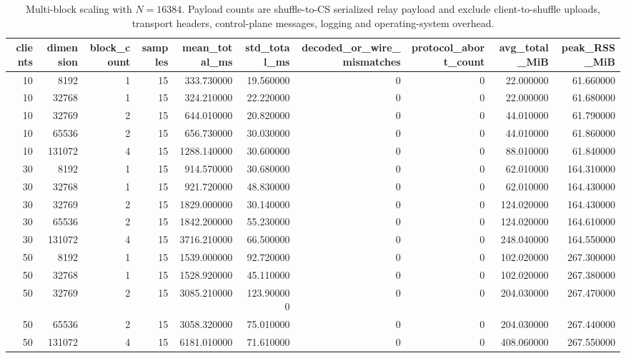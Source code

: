 \begin{table}
\caption{Multi-block scaling with \(N=16384\). Payload counts are shuffle-to-CS serialized relay payload and exclude client-to-shuffle uploads, transport headers, control-plane messages, logging and operating-system overhead.}
\label{tab:eval-multiblock}
\begin{tabular}{rrrrrrrrrr}
\toprule
clients & dimension & block_count & samples & mean_total_ms & std_total_ms & decoded_or_wire_mismatches & protocol_abort_count & avg_total_MiB & peak_RSS_MiB \\
\midrule
10 & 8192 & 1 & 15 & 333.730000 & 19.560000 & 0 & 0 & 22.000000 & 61.660000 \\
10 & 32768 & 1 & 15 & 324.210000 & 22.220000 & 0 & 0 & 22.000000 & 61.680000 \\
10 & 32769 & 2 & 15 & 644.010000 & 20.820000 & 0 & 0 & 44.010000 & 61.790000 \\
10 & 65536 & 2 & 15 & 656.730000 & 30.030000 & 0 & 0 & 44.010000 & 61.860000 \\
10 & 131072 & 4 & 15 & 1288.140000 & 30.600000 & 0 & 0 & 88.010000 & 61.840000 \\
30 & 8192 & 1 & 15 & 914.570000 & 30.680000 & 0 & 0 & 62.010000 & 164.310000 \\
30 & 32768 & 1 & 15 & 921.720000 & 48.830000 & 0 & 0 & 62.010000 & 164.430000 \\
30 & 32769 & 2 & 15 & 1829.000000 & 30.140000 & 0 & 0 & 124.020000 & 164.430000 \\
30 & 65536 & 2 & 15 & 1842.200000 & 55.230000 & 0 & 0 & 124.020000 & 164.610000 \\
30 & 131072 & 4 & 15 & 3716.210000 & 66.500000 & 0 & 0 & 248.040000 & 164.550000 \\
50 & 8192 & 1 & 15 & 1539.000000 & 92.720000 & 0 & 0 & 102.020000 & 267.300000 \\
50 & 32768 & 1 & 15 & 1528.920000 & 45.110000 & 0 & 0 & 102.020000 & 267.380000 \\
50 & 32769 & 2 & 15 & 3085.210000 & 123.900000 & 0 & 0 & 204.030000 & 267.470000 \\
50 & 65536 & 2 & 15 & 3058.320000 & 75.010000 & 0 & 0 & 204.030000 & 267.440000 \\
50 & 131072 & 4 & 15 & 6181.010000 & 71.610000 & 0 & 0 & 408.060000 & 267.550000 \\
\bottomrule
\end{tabular}
\end{table}
